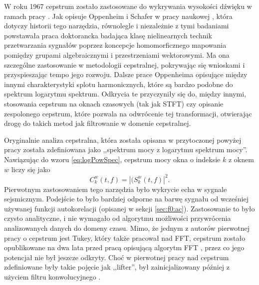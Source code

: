 \documentclass[12pt,a4paper,twoside]{mwart}
\begin{document}
W roku 1967 cepstrum zostało zastosowane do wykrywania wysokości dźwięku w ramach pracy \cite{Transcription:Noll:CepstrumPitchDetermination}. Jak opisuje Oppenheim i Schafer w pracy naukowej 
\cite[95-99]{Transcription:Oppenheim:HistoryOfCepstrum}
, która dotyczy historii tego narzędzia, równolegle i niezależnie z tymi badaniami powstawała praca doktorancka \cite{Transcription:Oppenheim:Superposition} badająca klasę nielinearnych technik przetwarzania sygnałów poprzez koncepcje homomorficznego mapowania pomiędzy grupami algebraicznymi i przestrzeniami wektorowymi. Ma ona szczególne zastosowanie w metodologii cepstralnej, pokrywając się wnioskami i przyspieszając tempo jego rozwoju. Dalsze prace Oppenheima opisujące między innymi charakterystyki splotu harmonicznych, które są bardzo podobne do spektrum logarytmu spektrum. Odkrycia te przyczyniły się do, między innymi, stosowania cepstrum na oknach czasowych (tak jak STFT) czy opisanie zespolonego cepstrum, które pozwala na odwrócenie tej transformacji, otwierając drogę do takich metod jak filtrowanie w domenie cepstralnej.

Oryginalnie analiza cepstralna, która została opisana w przytoczonej powyżej pracy \cite{Transcription:Bogert:FirstCepstrum} została zdefiniowana jako ,,spektrum mocy z logarytmu spektrum mocy''. Nawiązując do wzoru \ref{eq:logPowSpec}, cepstrum mocy okna o indeksie $k$ z oknem $w$ liczy się jako 
\begin{equation}\label{eq:ceps1}
  C_k^w(t, f) = |(S_k^w(t,f)|^2.
\end{equation}
Pierwotnym zastosowaniem tego narzędzia było wykrycie echa w sygnale sejsmicznym. Podejście to było bardziej odporne na barwę sygnału od wcześniej używanej funkcji autokorelacji (opisanej w sekcji \ref{sec:f0:ac}). Zastosowanie to było czysto analityczne, i nie wymagało od algorytmu możliwości przywrócenia analizowanych danych do domeny czasu. Mimo, że jednym z autorów pierwotnej pracy o cepstrum jest Tukey, który także pracował nad FFT, cepstrum zostało opublikowane na dwa lata przed pracą opisującą algorytm FFT \cite{Transcription:Tukey:FFT}, przez co jego potencjał nie był jeszcze odkryty. Choć w pierwotnej pracy nad cepstrum zdefiniowane były takie pojęcie jak ,,lifter'', był zainicjalizowany później z użyciem filtru konwolucyjnego 
\cite[1-2]{Transcription:Randall:CepstrumHistory}
.
\end{document}
